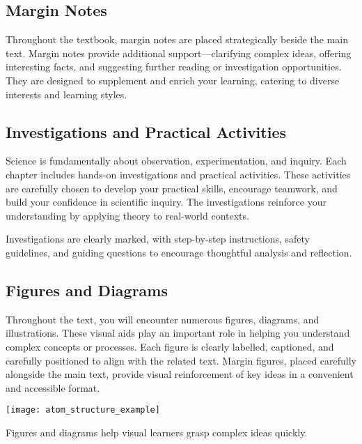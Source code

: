 \subsection{Margin Notes}

Throughout the textbook, margin notes are placed strategically beside the main text. Margin notes provide additional support—clarifying complex ideas, offering interesting facts, and suggesting further reading or investigation opportunities. They are designed to supplement and enrich your learning, catering to diverse interests and learning styles.


\subsection{Investigations and Practical Activities}

Science is fundamentally about observation, experimentation, and inquiry. Each chapter includes hands-on investigations and practical activities. These activities are carefully chosen to develop your practical skills, encourage teamwork, and build your confidence in scientific inquiry. The investigations reinforce your understanding by applying theory to real-world contexts.

Investigations are clearly marked, with step-by-step instructions, safety guidelines, and guiding questions to encourage thoughtful analysis and reflection.

\subsection{Figures and Diagrams}

Throughout the text, you will encounter numerous figures, diagrams, and illustrations. These visual aids play an important role in helping you understand complex concepts or processes. Each figure is clearly labelled, captioned, and carefully positioned to align with the related text. Margin figures, placed carefully alongside the main text, provide visual reinforcement of key ideas in a convenient and accessible format.

\begin{marginfigure}[0pt]
  \texttt{[image: atom\_structure\_example]}
  \caption{Figures and diagrams help visual learners grasp complex ideas quickly.}
\end{marginfigure}

